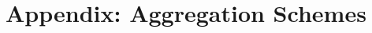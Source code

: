 \documentclass[AER]{AEA}
\begin{document}




\nocite{*}%

\newpage



\appendix
\newpage
\section{Appendix: Aggregation Schemes}
\label{apx:agg}
\end{document}
